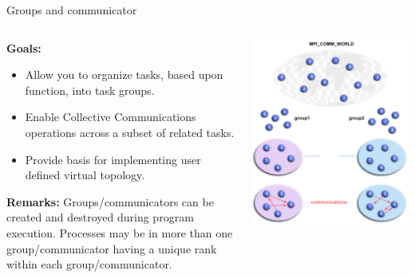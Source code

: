 \documentclass[aspectratio=43]{beamer}
\begin{document}
\begin{frame}[fragile]{Groups and communicator}
\begin{columns}
\begin{column}{0.5\paperwidth}
\textbf{Goals:}
\begin{itemize}
\item Allow you to organize tasks, based upon function, into task groups.
\item Enable Collective Communications operations across a subset of related tasks.
\item Provide basis for implementing user defined virtual topology.
\end{itemize}
\textbf{Remarks:}
Groups/communicators can be created and destroyed during program execution.
Processes may be in more than one group/communicator having a unique rank within each group/communicator.
\end{column}
\begin{column}{0.5\paperwidth}
\includegraphics[scale=0.36]{04.MPI_Topo/world.pdf}
\end{column}
\end{columns}
\end{frame}
\end{document}
